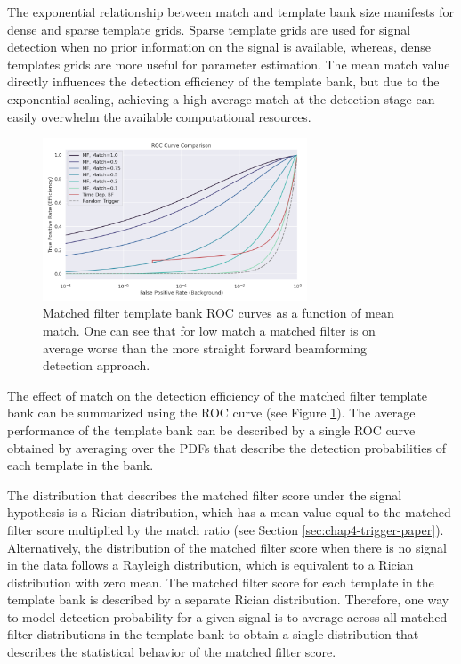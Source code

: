 The exponential relationship between match and template bank size manifests for dense and sparse template grids. Sparse template grids are used for signal detection when no prior information on the signal is available, whereas, dense templates grids are more useful for parameter estimation. The mean match value directly influences the detection efficiency of the template bank, but due to the exponential scaling, achieving a high average match at the detection stage can easily overwhelm the available computational resources.

\begin{figure}[htbp]
    \centering
    \includegraphics*[width=0.7\textwidth]{figs/Chapter-4/220223_mf_roc_curve_comparison_with_bf.png}
    \caption{\label{fig:chap4-mf-roc-curve-match-analysis} Matched filter template bank ROC curves as a function of mean match. One can see that for low match a matched filter is on average worse than the more straight forward beamforming detection approach. }
\end{figure}

The effect of match on the detection efficiency of the matched filter template bank can be summarized using the ROC curve (see Figure \ref{fig:chap4-mf-roc-curve-match-analysis}). The average performance of the template bank can be described by a single ROC curve obtained by averaging over the PDFs that describe the detection probabilities of each template in the bank. 

The distribution that describes the matched filter score under the signal hypothesis is a Rician distribution, which has a mean value equal to the matched filter score multiplied by the match ratio (see Section \ref{sec:chap4-trigger-paper}). Alternatively, the distribution of the matched filter score when there is no signal in the data follows a Rayleigh distribution, which is equivalent to a Rician distribution with zero mean. The matched filter score for each template in the template bank is described by a separate Rician distribution. Therefore, one way to model detection probability for a given signal is to average across all matched filter distributions in the template bank to obtain a single distribution that describes the statistical behavior of the matched filter score.

